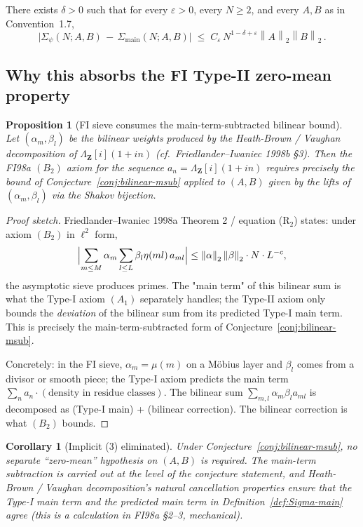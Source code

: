 \documentclass[11pt]{article}
\newtheorem{proposition}[theorem]{Proposition}
\newtheorem{corollary}[theorem]{Corollary}
\theoremstyle{definition}
\newcommand{\Z}{\mathbf{Z}}
\newcommand{\Zi}{\Z[i]}
\newcommand{\norm}[1]{\left\lVert #1\right\rVert}
\begin{document}
\begin{conjecture}\label{conj:bilinear-msub}
There exists $\delta>0$ such that for every $\varepsilon>0$, every $N\ge 2$, and every $A,B$ as in Convention~1.7,
\[
   \bigl|\Sigma_\psi(N;A,B)\,-\,\Sigma_{\mathrm{main}}(N;A,B)\bigr|\;\le\;C_\varepsilon\,N^{1-\delta+\varepsilon}\norm{A}_2\norm{B}_2\,.
\]
\end{conjecture}

\subsection{Why this absorbs the FI Type-II zero-mean property}\label{ssec:absorbs-zero-mean}

\begin{proposition}[FI sieve consumes the main-term-subtracted bilinear bound]\label{prop:FI-consumes-msub}
Let $(\alpha_m,\beta_l)$ be the bilinear weights produced by the Heath-Brown / Vaughan decomposition of $\Lambda_\Zi(1+in)$ (cf.\ Friedlander--Iwaniec 1998b §3). Then the FI98a $(B_2)$ axiom for the sequence $a_n=\Lambda_\Zi(1+in)$ requires precisely the bound of Conjecture~\ref{conj:bilinear-msub} applied to $(A,B)$ given by the lifts of $(\alpha_m,\beta_l)$ via the Shakov bijection.
\end{proposition}

\begin{proof}[Proof sketch]
Friedlander--Iwaniec 1998a Theorem 2 / equation (R$_2$) states: under axiom $(B_2)$ in $\ell^2$ form,
\[
   \Bigl|\sum_{m\le M}\alpha_m\sum_{l\le L}\beta_l\eta(ml)\,a_{ml}\Bigr|\le\norm\alpha_2\norm\beta_2\cdot N\cdot L^{-c},
\]
the asymptotic sieve produces primes. The "main term" of this bilinear sum is what the Type-I axiom $(A_1)$ separately handles; the Type-II axiom only bounds the \emph{deviation} of the bilinear sum from its predicted Type-I main term. This is precisely the main-term-subtracted form of Conjecture~\ref{conj:bilinear-msub}.

Concretely: in the FI sieve, $\alpha_m = \mu(m)$ on a Möbius layer and $\beta_l$ comes from a divisor or smooth piece; the Type-I axiom predicts the main term $\sum_n a_n \cdot (\text{density in residue classes})$. The bilinear sum $\sum_{m,l} \alpha_m\beta_l a_{ml}$ is decomposed as (Type-I main) + (bilinear correction). The bilinear correction is what $(B_2)$ bounds.
\end{proof}

\begin{corollary}[Implicit (3) eliminated]\label{cor:elim-3}
Under Conjecture~\ref{conj:bilinear-msub}, no separate ``zero-mean'' hypothesis on $(A,B)$ is required. The main-term subtraction is carried out at the level of the conjecture statement, and Heath-Brown / Vaughan decomposition's natural cancellation properties ensure that the Type-I main term and the predicted main term in Definition~\ref{def:Sigma-main} agree (this is a calculation in FI98a §2--3, mechanical).
\end{corollary}
\end{document}
